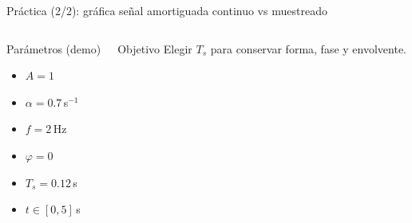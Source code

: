 \documentclass[aspectratio=169,10pt]{beamer}
\newcommand{\importantbox}[2][Importante]{%
\begin{alertblock}{#1}#2\end{alertblock}}
\begin{document}
\begin{frame}{Práctica (2/2): gráfica señal amortiguada continuo vs muestreado}
\small
\begin{columns}[T]
\begin{block}{Parámetros (demo)}
\begin{itemize}
\item $A=1$
\item $\alpha=0.7\,$s$^{-1}$
\item $f=2\,$Hz
\item $\varphi=0$
\item $T_s=0.12\,$s
\item $t \in [0,5]\,$s
\end{itemize}
\end{block}
\importantbox[Objetivo]{
Elegir $T_s$ para conservar forma, fase y envolvente.
}

\end{columns}
\end{frame}
\end{document}
